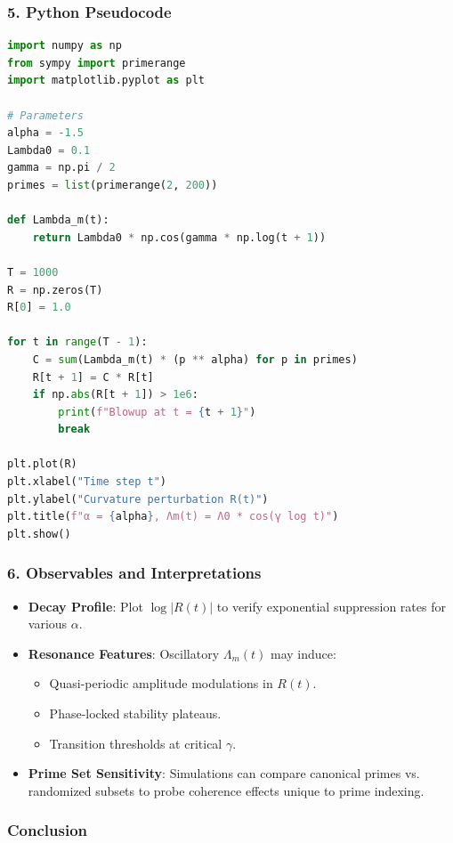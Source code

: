 \documentclass[12pt]{article}
\theoremstyle{plain}
\begin{document}
\subsubsection*{5. Python Pseudocode}

\begin{lstlisting}[language=Python, caption={Recursive Ricci Simulation}, basicstyle=\ttfamily\small]
import numpy as np
from sympy import primerange
import matplotlib.pyplot as plt

# Parameters
alpha = -1.5
Lambda0 = 0.1
gamma = np.pi / 2
primes = list(primerange(2, 200))

def Lambda_m(t):
    return Lambda0 * np.cos(gamma * np.log(t + 1))

T = 1000
R = np.zeros(T)
R[0] = 1.0

for t in range(T - 1):
    C = sum(Lambda_m(t) * (p ** alpha) for p in primes)
    R[t + 1] = C * R[t]
    if np.abs(R[t + 1]) > 1e6:
        print(f"Blowup at t = {t + 1}")
        break

plt.plot(R)
plt.xlabel("Time step t")
plt.ylabel("Curvature perturbation R(t)")
plt.title(f"α = {alpha}, Λm(t) = Λ0 * cos(γ log t)")
plt.show()
\end{lstlisting}

\subsubsection*{6. Observables and Interpretations}

\begin{itemize}
    \item \textbf{Decay Profile}: Plot $\log |R(t)|$ to verify exponential suppression rates for various $\alpha$.
    \item \textbf{Resonance Features}: Oscillatory $\Lambda_m(t)$ may induce:
    \begin{itemize}
        \item Quasi-periodic amplitude modulations in $R(t)$.
        \item Phase-locked stability plateaus.
        \item Transition thresholds at critical $\gamma$.
    \end{itemize}
    \item \textbf{Prime Set Sensitivity}: Simulations can compare canonical primes vs. randomized subsets to probe coherence effects unique to prime indexing.
\end{itemize}

\subsubsection*{Conclusion}
\end{document}
